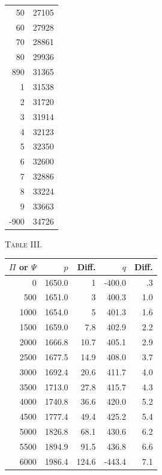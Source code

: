 \documentclass[11pt,a4paper]{article}
\begin{document}
\begin{center}
\begin{minipage}{0.42\linewidth}
\begin{tabular}{rr}
50&27105\\
60&27928\\
70&28861\\
80&29936\\
890&31365\\
1&31538\\
2&31720\\
3&31914\\
4&32123\\
5&32350\\
6&32600\\
7&32886\\
8&33224\\
9&33663\\
-900&34726\\
\bottomrule
\end{tabular}
\end{minipage}
\end{center}

\begin{center}
\textsc{Table III.}\par
\begin{tabular}{rrrrr}
\toprule
$\Pi$ or $\Psi$&$p$&Diff.&$q$&Diff.\\
\midrule
0&1650.0&1&-400.0&.3\\
500&1651.0&3&400.3&1.0\\
1000&1654.0&5&401.3&1.6\\
1500&1659.0&7.8&402.9&2.2\\
2000&1666.8&10.7&405.1&2.9\\
2500&1677.5&14.9&408.0&3.7\\
3000&1692.4&20.6&411.7&4.0\\
3500&1713.0&27.8&415.7&4.3\\
4000&1740.8&36.6&420.0&5.2\\
4500&1777.4&49.4&425.2&5.4\\
5000&1826.8&68.1&430.6&6.2\\
5500&1894.9&91.5&436.8&6.6\\
6000&1986.4&124.6&-443.4&7.1\\
\bottomrule
\end{tabular}
\end{center}
\end{document}
